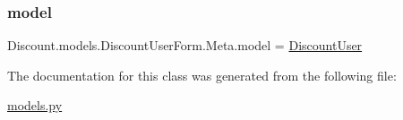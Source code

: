 \subsubsection{\texorpdfstring{model}{model}}
{\footnotesize\ttfamily Discount.\+models.\+Discount\+User\+Form.\+Meta.\+model = \hyperlink{class_discount_1_1models_1_1_discount_user}{Discount\+User}\hspace{0.3cm}{\ttfamily [static]}}



The documentation for this class was generated from the following file\+:\begin{DoxyCompactItemize}
\item 
\hyperlink{models_8py}{models.\+py}\end{DoxyCompactItemize}
